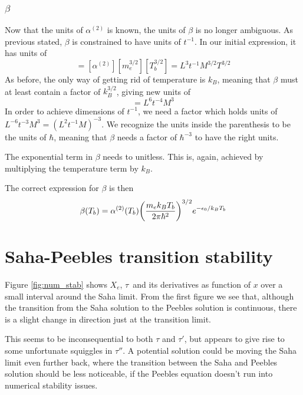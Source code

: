 \documentclass[10pt, a4paper]{article}
\begin{document}
\subsubsection{\texorpdfstring{\textbf{$\beta$}}{TEXT} }
Now that the units of $\alpha^{(2)}$ is known, the units of $\beta$ is no longer ambiguous. As previous stated, $\beta$ is constrained to have units of $t^{-1}$. In our initial expression, it has units of
\begin{equation*}
    [\beta] = [\alpha^{(2)}][m_e^{3/2}][T_b^{3/2}] = L^3t^{-1}M^{3/2}T^{3/2}
\end{equation*}
As before, the only way of getting rid of temperature is $k_B$, meaning that $\beta$ must at least contain a factor of $k_B^{3/2}$, giving new units of
\begin{equation*}
    [\beta][k_B^{3/2}] = L^6t^{-4}M^3
\end{equation*}
In order to achieve dimensions of $t^{-1}$, we need a factor which holds units of $L^{-6}t^{-3}M^3 = (L^2t^{-1}M)^{-3}$. We recognize the units inside the parenthesis to be the units of $\hbar$, meaning that $\beta$ needs a factor of $\hbar^{-3}$ to have the right units.

The exponential term in $\beta$ needs to unitless. This is, again, achieved by multiplying the temperature term by $k_B$.

The correct expression for $\beta$ is then
\begin{equation*}
    \beta\qty(T_{b}) = \alpha^{(2)}\qty(T_{b}) \qty(\frac{m_{e} k_B T_{b}}{2 \pi \hbar^2})^{3 / 2} e^{-\epsilon_{0} / k_BT_{b}}
\end{equation*}



\section{Saha-Peebles transition stability}
Figure \ref{fig:num_stab} shows $X_e$, $\tau$ and its derivatives as function of $x$ over a small interval around the Saha limit. From the first figure we see that, although the transition from the Saha solution to the Peebles solution is continuous, there is a slight change in direction just at the transition limit.

This seems to be inconsequential to both $\tau$ and $\tau'$, but appears to give rise to some unfortunate squiggles in $\tau''$. A potential solution could be moving the Saha limit even further back, where the transition between the Saha and Peebles solution should be less noticeable, if the Peebles equation doesn't run into numerical stability issues.
\end{document}
